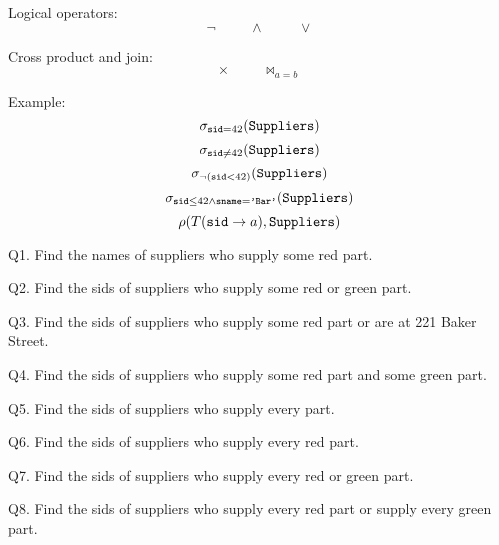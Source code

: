 Logical operators:
\[
\lnot   \hspace{1cm}   \land   \hspace{1cm}   \lor
\]

Cross product and join:
\[
\times   \hspace{1cm}
\Join_{a = b}
\]

Example:
\[
\sigma_{\texttt{sid} = 42}(\texttt{Suppliers})
\]
\[
\sigma_{\texttt{sid} \neq 42}(\texttt{Suppliers})
\]
\[
\sigma_{\lnot (\texttt{sid} < 42)}(\texttt{Suppliers})
\]
\[
\sigma_{\texttt{sid} \leq 42 \land \texttt{sname} = \texttt{'Bar'} }(\texttt{Suppliers})
\]
\[
\rho(T(\texttt{sid} \rightarrow a), \texttt{Suppliers})
\]

\newpage
Q1.
Find the names of suppliers who supply some red part.

\SOLUTION


\newpage
Q2.
Find the sids of suppliers who supply some red or green part.

\SOLUTION


\newpage
Q3.
Find the sids of suppliers who supply some red part or are at 221 Baker Street.

\SOLUTION


\newpage
Q4.
Find the sids of suppliers who supply some red part and some green part.

\SOLUTION


\newpage
Q5.
Find the sids of suppliers who supply every part.

\SOLUTION


\newpage
Q6.
Find the sids of suppliers who supply every red part.

\SOLUTION


\newpage
Q7.
Find the sids of suppliers who supply every red or green part.

\SOLUTION


\newpage
Q8.
Find the sids of suppliers who supply every red part or supply every green part.

